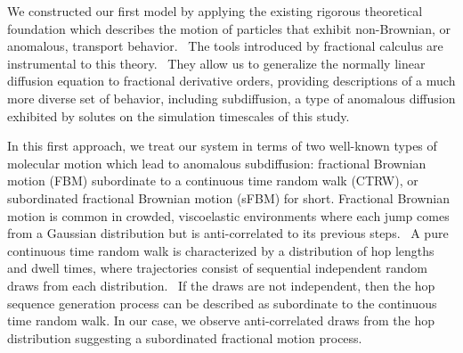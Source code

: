 \documentclass[journal=jctcce,manuscript=article]{achemso}
\begin{document}
  We constructed our first model by applying the existing rigorous theoretical
  foundation which describes the motion of particles that exhibit non-Brownian,
  or anomalous, transport behavior.~\cite{metzler_random_2000,bouchaud_anomalous_1990} 
  The tools introduced by fractional calculus are instrumental to this 
  theory.~\cite{gorenflo_fractional_1997} They allow us to generalize the normally
  linear diffusion equation to fractional derivative orders, providing descriptions
  of a much more diverse set of behavior, including subdiffusion, a type of 
  anomalous diffusion exhibited by solutes on the simulation timescales of this
  study.~\cite{klages_anomalous_2008}

  \label{r1_comment1}  %
  In this first approach, we treat our system in terms of two well-known types
  of molecular motion which lead to anomalous subdiffusion:   
  fractional Brownian motion (FBM) subordinate to a 
  continuous time random walk (CTRW), or subordinated fractional Brownian motion
  (sFBM) for short. Fractional Brownian motion is common in crowded, viscoelastic 
  environments where each jump comes from a Gaussian distribution but is 
  anti-correlated to its previous steps.~\cite{mandelbrot_fractional_1968,jeon_fractional_2010,banks_anomalous_2005}
  A pure continuous time random walk is characterized by a distribution of hop 
  lengths and dwell times, where trajectories consist of sequential independent
  random draws from each distribution.~\cite{montroll_random_1965} If the draws
  are not independent, then the hop sequence generation process can be described 
  as subordinate to the continuous time random walk. In our case, we observe 
  anti-correlated draws from the hop distribution suggesting a subordinated 
  fractional motion process. %
  
  
\end{document}
